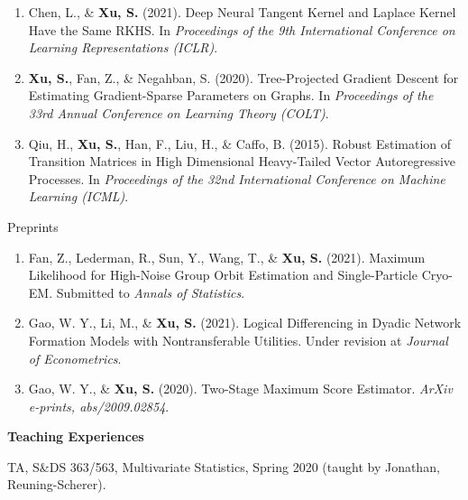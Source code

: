 \documentclass{article}
\begin{document}
\begin{enumerate}
\item Chen, L., \& \textbf{Xu, S.} (2021). Deep Neural Tangent Kernel and Laplace Kernel Have the Same RKHS. In \emph{Proceedings of the 9th International Conference on Learning Representations (ICLR)}.
\item \textbf{Xu, S.}, Fan, Z., \& Negahban, S. (2020). Tree-Projected Gradient Descent for Estimating Gradient-Sparse Parameters on Graphs.  In \emph{Proceedings of the 33rd Annual Conference on Learning Theory (COLT)}.
\item Qiu, H., \textbf{Xu, S.}, Han, F., Liu, H., \& Caffo, B. (2015). Robust Estimation of Transition Matrices in High Dimensional Heavy-Tailed Vector Autoregressive Processes. In \emph{Proceedings of the 32nd International
Conference on Machine Learning (ICML)}.
\end{enumerate}



\begin{large}
\noindent Preprints
\end{large}

\begin{enumerate}

\item Fan, Z., Lederman, R., Sun, Y., Wang, T., \& \textbf{Xu, S.} (2021). Maximum Likelihood for High-Noise Group Orbit Estimation and Single-Particle Cryo-EM. Submitted to \emph{Annals of Statistics}.

\item Gao, W. Y., Li, M., \& \textbf{Xu, S.} (2021). Logical Differencing in Dyadic Network Formation Models with Nontransferable Utilities. Under revision at \emph{Journal of Econometrics}.

\item Gao, W. Y., \& \textbf{Xu, S.} (2020). Two-Stage Maximum Score Estimator. \emph{ArXiv e-prints, abs/2009.02854}.
\end{enumerate}





\vspace{5mm}
\begin{large}
\noindent \textbf{Teaching Experiences}
\end{large}
\vspace{5mm}


TA, S\&{DS} 363/563, Multivariate Statistics, Spring 2020 (taught by Jonathan, Reuning-Scherer). 
\end{document}
